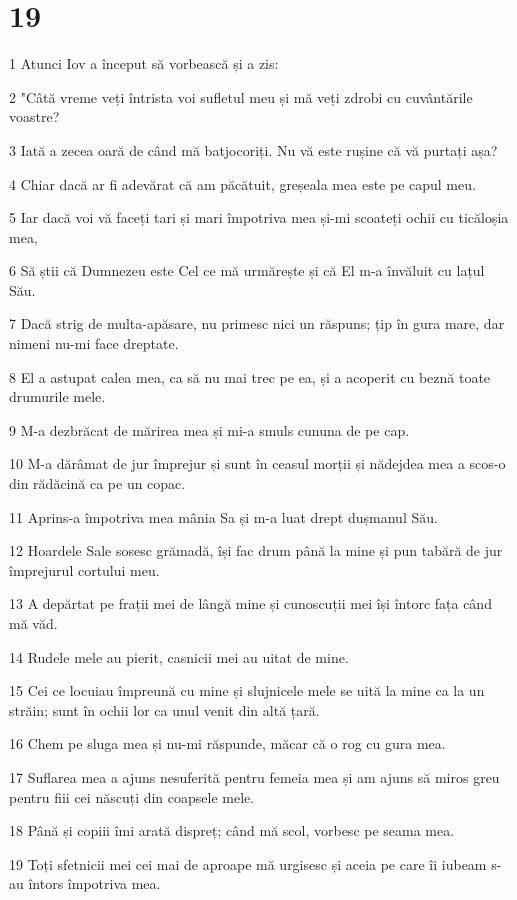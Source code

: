 \chapter{19}

\par 1 Atunci Iov a început să vorbească și a zis:
\par 2 "Câtă vreme veți întrista voi sufletul meu și mă veți zdrobi cu cuvântările voastre?
\par 3 Iată a zecea oară de când mă batjocoriți. Nu vă este rușine că vă purtați așa?
\par 4 Chiar dacă ar fi adevărat că am păcătuit, greșeala mea este pe capul meu.
\par 5 Iar dacă voi vă faceți tari și mari împotriva mea și-mi scoateți ochii cu ticăloșia mea,
\par 6 Să știi că Dumnezeu este Cel ce mă urmărește și că El m-a învăluit cu lațul Său.
\par 7 Dacă strig de multa-apăsare, nu primesc nici un răspuns; țip în gura mare, dar nimeni nu-mi face dreptate.
\par 8 El a astupat calea mea, ca să nu mai trec pe ea, și a acoperit cu beznă toate drumurile mele.
\par 9 M-a dezbrăcat de mărirea mea și mi-a smuls cununa de pe cap.
\par 10 M-a dărâmat de jur împrejur și sunt în ceasul morții și nădejdea mea a scos-o din rădăcină ca pe un copac.
\par 11 Aprins-a împotriva mea mânia Sa și m-a luat drept dușmanul Său.
\par 12 Hoardele Sale sosesc grămadă, își fac drum până la mine și pun tabără de jur împrejurul cortului meu.
\par 13 A depărtat pe frații mei de lângă mine și cunoscuții mei își întorc fața când mă văd.
\par 14 Rudele mele au pierit, casnicii mei au uitat de mine.
\par 15 Cei ce locuiau împreună cu mine și slujnicele mele se uită la mine ca la un străin; sunt în ochii lor ca unul venit din altă țară.
\par 16 Chem pe sluga mea și nu-mi răspunde, măcar că o rog cu gura mea.
\par 17 Suflarea mea a ajuns nesuferită pentru femeia mea și am ajuns să miros greu pentru fiii cei născuți din coapsele mele.
\par 18 Până și copiii îmi arată dispreț; când mă scol, vorbesc pe seama mea.
\par 19 Toți sfetnicii mei cei mai de aproape mă urgisesc și aceia pe care îi iubeam s-au întors împotriva mea.
